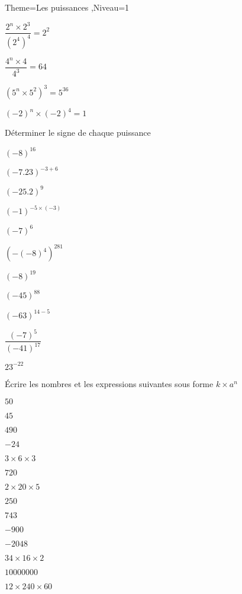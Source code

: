 \documentclass[a4paper,12pt]{article}
\begin{document}
\begin{Maquette}[Fiche]{Theme=Les puissances ,Niveau=1}
\begin{exercice}
\begin{itemize*} 
\item[] $\dfrac{2^{n}\times 2^{3}}{(2^{4})^{4}}=2^{2}$ 
\item $\dfrac{4^{n}\times 4}{4^{3}}=64$ 
\item $(5^{n}\times 5^{2})^{3}=5^{36}$
\item $(-2)^{n}\times (-2)^{4}=1$ 
\end{itemize*}
\end{exercice}

\begin{exercice}
Déterminer le signe de chaque puissance

\begin{itemize*}
\item[] $(-8)^{16}$
\item $(-7.23)^{-3+6}$
\item $(-25.2)^{9}$
\item $(-1)^{-5\times (-3)}$
\item $(-7)^{6}$
\item $(-(-8)^{4})^{281}$
\end{itemize*}\vspace{0.5cm}

\begin{itemize*}
\item[] $(-8)^{19}$
\item $(-45)^{88}$
\item $(-63)^{14-5}$
\item $\dfrac{(-7)^{5}}{(-41)^{17}}$
\item $23^{-22}$
\end{itemize*}
\end{exercice}

\begin{exercice}
\'Ecrire les nombres et les expressions suivantes sous forme $k\times a^{n}$

\begin{itemize*}
\item[] $50$
\item $45$
\item $490$
\item $-24$
\item $3\times 6\times 3$
\item $720$
\item $2\times 20 \times 5 $
\end{itemize*}\vspace{0.5cm}

\begin{itemize*}
\item[] $250$
\item $743$
\item $-900$
\item $-2048$
\item $34\times 16\times 2$
\item $10000000$
\item $12\times 240 \times 60 $
\end{itemize*}
\end{exercice}

\end{Maquette}
\end{document}
